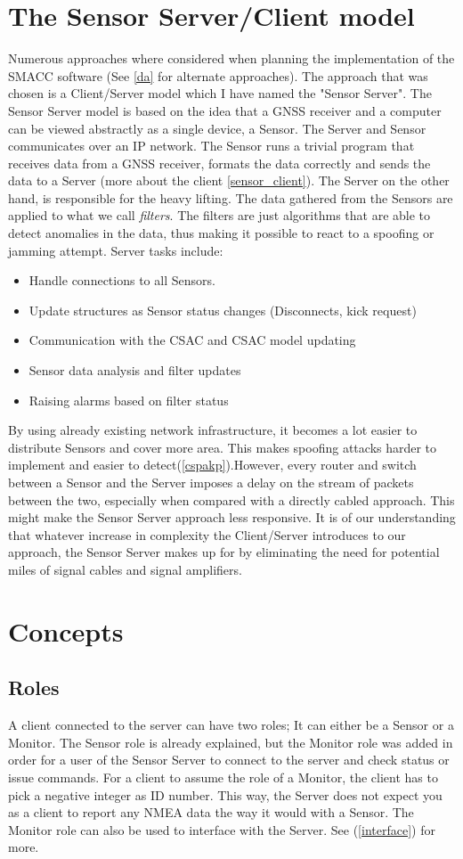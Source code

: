 \documentclass[12pt,english,a4paper]{report}
\begin{document}
\section{The Sensor Server/Client model}
Numerous approaches where considered when planning the implementation of the SMACC software (See \ref{da} for alternate approaches). The approach that was chosen is a Client/Server model which I have named the "Sensor Server". The Sensor Server model is based on the idea that a GNSS receiver and a computer can be viewed abstractly as a single device, a Sensor. The Server and Sensor communicates over an IP network. The Sensor runs a trivial program that receives data from a GNSS receiver, formats the data correctly and sends the data to a Server (more about the client \ref{sensor_client}). The Server on the other hand, is responsible for the heavy lifting. The data gathered from the Sensors are applied to what we call \textit{filters}. The filters are just algorithms that are able to detect anomalies in the data, thus making it possible to react to a spoofing or jamming attempt. Server tasks include:
\begin{itemize}
  \item Handle connections to all Sensors.
  \item Update structures as Sensor status changes (Disconnects, kick request)
  \item Communication with the CSAC and CSAC model updating
  \item Sensor data analysis and filter updates
  \item Raising alarms based on filter status
\end{itemize}
By using already existing network infrastructure, it becomes a lot easier to distribute Sensors and cover more area. This makes spoofing attacks harder to implement and easier to detect(\ref{cspakp}).However, every router and switch between a Sensor and the Server imposes a delay on the stream of packets between the two, especially when compared with a directly cabled approach. This might make the Sensor Server approach less responsive. It is of our understanding that whatever increase in complexity the Client/Server introduces to our approach, the Sensor Server makes up for by eliminating the need for potential miles of signal cables and signal amplifiers. 

\section{Concepts}
\subsection{Roles}\label{roles}
A client connected to the server can have two roles; It can either be a Sensor or a Monitor. The Sensor role is already explained, but the Monitor role was added in order for a user of the Sensor Server to connect to the server and check status or issue commands. For a client to assume the role of a Monitor, the client has to pick a negative integer as ID number. This way, the Server does not expect you as a client to report any NMEA data the way it would with a Sensor. The Monitor role can also be used to interface with the Server. See (\ref{interface}) for more.
\end{document}
